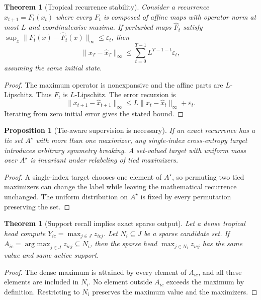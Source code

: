 \documentclass[11pt]{article}
\newtheorem{theorem}[definition]{Theorem}
\newtheorem{proposition}[definition]{Proposition}
\newcommand{\argmax}{\operatorname*{arg\ max}}
\newcommand{\eps}{\varepsilon}
\begin{document}
\begin{theorem}[Tropical recurrence stability]
Consider a recurrence $x_{t+1}=F_t(x_t)$ where every $F_t$ is composed of affine maps with operator norm at most $L$ and coordinatewise maxima. If perturbed maps $\hat F_t$ satisfy $\sup_x\|F_t(x)-\hat F_t(x)\|_\infty\le\eps_t$, then
\begin{equation}
\|x_T-\hat x_T\|_\infty\le \sum_{t=0}^{T-1}L^{T-1-t}\eps_t,
\end{equation}
assuming the same initial state.
\end{theorem}
\begin{proof}
The maximum operator is nonexpansive and the affine parts are $L$-Lipschitz. Thus $F_t$ is $L$-Lipschitz. The error recursion is
\begin{equation}
\|x_{t+1}-\hat x_{t+1}\|_\infty\le L\|x_t-\hat x_t\|_\infty+\eps_t.
\end{equation}
Iterating from zero initial error gives the stated bound.
\end{proof}

\begin{proposition}[Tie-aware supervision is necessary]
If an exact recurrence has a tie set $A^\star$ with more than one maximizer, any single-index cross-entropy target introduces arbitrary symmetry breaking. A set-valued target with uniform mass over $A^\star$ is invariant under relabeling of tied maximizers.
\end{proposition}
\begin{proof}
A single-index target chooses one element of $A^\star$, so permuting two tied maximizers can change the label while leaving the mathematical recurrence unchanged. The uniform distribution on $A^\star$ is fixed by every permutation preserving the set.
\end{proof}

\begin{theorem}[Support recall implies exact sparse output]
Let a dense tropical head compute $Y_{ic}=\max_{j\in J}z_{icj}$. Let $N_i\subseteq J$ be a sparse candidate set. If $A_{ic}=\argmax_{j\in J}z_{icj}\subseteq N_i$, then the sparse head $\max_{j\in N_i}z_{icj}$ has the same value and same active support.
\end{theorem}
\begin{proof}
The dense maximum is attained by every element of $A_{ic}$, and all these elements are included in $N_i$. No element outside $A_{ic}$ exceeds the maximum by definition. Restricting to $N_i$ preserves the maximum value and the maximizers.
\end{proof}
\end{document}
